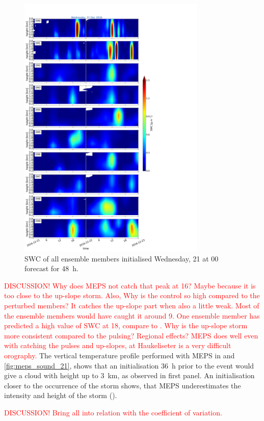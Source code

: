 \begin{figure}[t]
	\centering
	\includegraphics[trim={0cm 0cm 18.3cm 5.1cm},clip,width=0.8\textwidth]{./fig_09EM/20161221}
	\caption{SWC of all ensemble members initialised Wednesday, \SI{21}{\dec} at 0\SI{0}{\UTC} forecast for \SI{48}{\hour}.}\label{fig:EM09_21}
\end{figure}
%
\textcolor{red}{DISCUSSION! Why does MEPS not catch that peak at \SI{16}{\UTC}? Maybe because it is too close to the up-slope storm. Also, Why is the control so high compared to the perturbed members? It catches the up-slope part when also a little weak. Most of the ensemble members would have caught it around \SI{9}{\UTC}. One ensemble member has predicted a high value of SWC at \SI{18}{\UTC}, compare to . Why is the up-slope storm more consistent compared to the pulsing? Regional effects? MEPS does well even with catching the pulses and up-slopes, at Haukeliseter is a very difficult orography. }
\newline \noindent
The vertical temperature profile performed with MEPS in  and \ref{fig:meps_sound_21}, shows that an initialisation \SI{36}{\hour} prior to the event would give a cloud with height up to \SI{3}{\km}, as observed in  first panel. An initialisation closer to the occurrence of the storm shows, that MEPS underestimates the intensity and height of the storm ().
%

\textcolor{red}{DISCUSSION! Bring all into relation with the coefficient of variation.}



